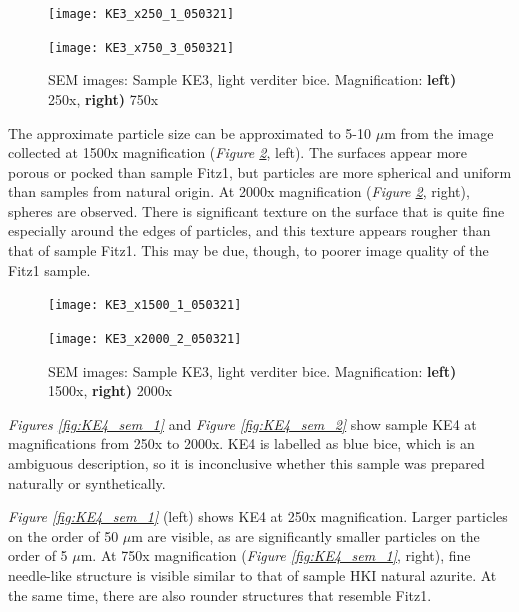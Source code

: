 \begin{figure}[H]
\centering
\begin{minipage}{.45\textwidth}
  \centering
  \texttt{[image: KE3\_x250\_1\_050321]}
\end{minipage}
\begin{minipage}{.45\textwidth}
  \centering
  \texttt{[image: KE3\_x750\_3\_050321]}
\end{minipage}
\caption[SEM images: Sample KE3, light verditer bice]{SEM images: Sample KE3, light verditer bice. Magnification: \textbf{left)} 250x, \textbf{right)} 750x}
\label{fig:KE3_sem_1}
\end{figure}

The approximate particle size can be approximated to 5-10 $\mu$m from the image collected at 1500x magnification (\textit{Figure \ref{fig:KE3_sem_2}}, left). The surfaces appear more porous or pocked than sample Fitz1, but particles are more spherical and uniform than samples from natural origin. At 2000x magnification (\textit{Figure \ref{fig:KE3_sem_2}}, right), spheres are observed. There is significant texture on the surface that is quite fine especially around the edges of particles, and this texture appears rougher than that of sample Fitz1. This may be due, though, to poorer image quality of the Fitz1 sample.

\begin{figure}[H]
\centering
\begin{minipage}{.45\textwidth}
  \centering
  \texttt{[image: KE3\_x1500\_1\_050321]}
\end{minipage}
\begin{minipage}{.45\textwidth}
  \centering
  \texttt{[image: KE3\_x2000\_2\_050321]}
\end{minipage}
\caption[SEM images: Sample KE3, light verditer bice]{SEM images: Sample KE3, light verditer bice. Magnification: \textbf{left)} 1500x, \textbf{right)} 2000x}
\label{fig:KE3_sem_2}
\end{figure}


\textit{Figures \ref{fig:KE4_sem_1}} and \textit{Figure \ref{fig:KE4_sem_2}} show sample KE4 at magnifications from 250x to 2000x. KE4 is labelled as blue bice, which is an ambiguous description, so it is inconclusive whether this sample was prepared naturally or synthetically.

\textit{Figure \ref{fig:KE4_sem_1}} (left) shows KE4 at 250x magnification. Larger particles on the order of 50 $\mu$m are visible, as are significantly smaller particles on the order of 5 $\mu$m. At 750x magnification (\textit{Figure \ref{fig:KE4_sem_1}}, right), fine needle-like structure is visible similar to that of sample HKI natural azurite. At the same time, there are also rounder structures that resemble Fitz1. 

